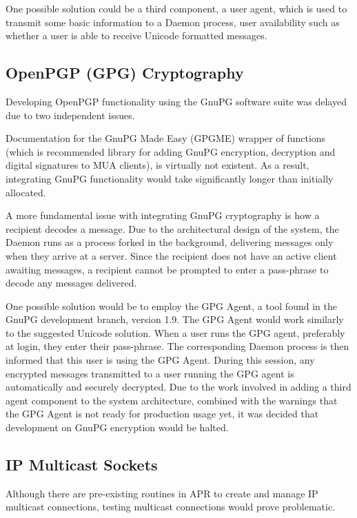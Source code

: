 One possible solution could be a third component, a user
agent, which is used to transmit some basic information to a Daemon
process, user availability such as whether a user is able to receive 
Unicode formatted messages.

\subsection{OpenPGP (GPG) Cryptography}

Developing OpenPGP functionality using the GnuPG software
suite was delayed due to two independent issues.


Documentation for the GnuPG Made Easy (GPGME) wrapper of
functions (which is recommended library for adding GnuPG encryption,
decryption and digital signatures to MUA clients), is virtually not
existent. As a result, integrating GnuPG functionality would take
significantly longer than initially allocated.


A more fundamental issue with integrating GnuPG cryptography 
is how a recipient decodes a message. Due to the architectural 
design of the system, the Daemon runs as a process forked in the 
background, delivering messages only when they arrive at a server. 
Since the recipient does not have an active client awaiting messages, 
a recipient cannot be prompted to enter a pass-phrase to decode any 
messages delivered. 


One possible solution would be to employ the GPG Agent, a 
tool found in the GnuPG development branch, version 1.9. The GPG
Agent would work similarly to the suggested Unicode solution. When a
user runs the GPG agent, preferably at login, they enter their
pass-phrase. The corresponding Daemon process is then informed that
this user is using the GPG Agent. During this session, any encrypted 
messages transmitted to a user running the GPG agent is automatically
and securely decrypted. Due to the work involved in adding a third
agent component to the system architecture, combined with the
warnings that the GPG Agent is not ready for production usage yet, it
was decided that development on GnuPG encryption would be halted.

\subsection{IP Multicast Sockets}

Although there are pre-existing routines in APR to create and
manage IP multicast connections, testing multicast connections would
prove problematic. 

